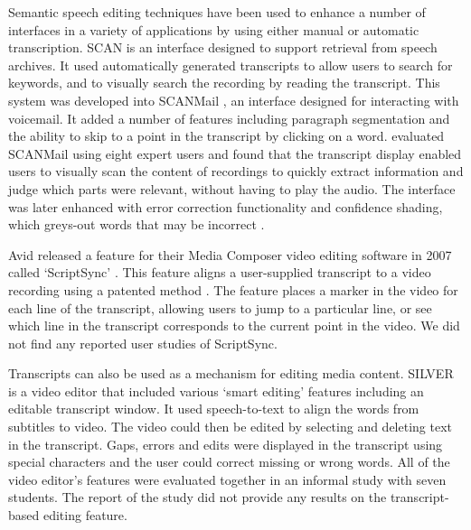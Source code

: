 Semantic speech editing techniques have been used to enhance a number of interfaces in a variety of applications by
using either manual or automatic transcription.
SCAN \citep{Whittaker1999} is an interface designed to support retrieval from speech archives. It used automatically
generated transcripts to allow users to search for keywords, and to visually search the recording by reading the
transcript. This system was developed into SCANMail \citep{Whittaker2002}, an interface designed for interacting with
voicemail. It added a number of features including paragraph segmentation and the ability to skip to a point in the
transcript by clicking on a word. \citet{Whittaker2002} evaluated SCANMail using eight expert users and found that the transcript display
enabled users to visually scan the content of recordings to quickly extract information and judge which parts were
relevant, without having to play the audio.  The interface was later enhanced with error correction functionality and
confidence shading, which greys-out words that may be incorrect \citep{Burke2006}.

Avid released a feature for their Media Composer video editing software in 2007 called `ScriptSync' \citep{Avid2011}.
This feature aligns a user-supplied transcript to a video recording using a patented method \citep{Griggs2007}. The
feature places a marker in the video for each line of the transcript, allowing users to jump to a particular line, or
see which line in the transcript corresponds to the current point in the video.  We did not find any reported user
studies of ScriptSync.

Transcripts can also be used as a mechanism for editing media content.  \mbox{SILVER} \citep{Casares2002, Long2003} is
a video editor that included various `smart editing' features including an editable transcript window. It used
speech-to-text to align the words from subtitles to video. The video could then be edited by selecting and deleting
text in the transcript. Gaps, errors and edits were displayed in the transcript using special characters and the user
could correct missing or wrong words. All of the video editor's features were evaluated together in an informal study
with seven students. The report of the study did not provide any results on the transcript-based editing feature.

